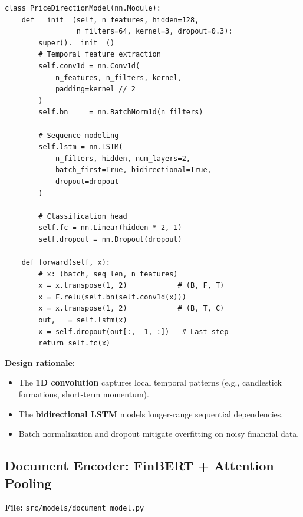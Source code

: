 \documentclass[12pt, a4paper]{article}
\begin{document}
\begin{lstlisting}[caption={Price direction model}]
class PriceDirectionModel(nn.Module):
    def __init__(self, n_features, hidden=128,
                 n_filters=64, kernel=3, dropout=0.3):
        super().__init__()
        # Temporal feature extraction
        self.conv1d = nn.Conv1d(
            n_features, n_filters, kernel,
            padding=kernel // 2
        )
        self.bn     = nn.BatchNorm1d(n_filters)
        
        # Sequence modeling
        self.lstm = nn.LSTM(
            n_filters, hidden, num_layers=2,
            batch_first=True, bidirectional=True,
            dropout=dropout
        )
        
        # Classification head
        self.fc = nn.Linear(hidden * 2, 1)
        self.dropout = nn.Dropout(dropout)
    
    def forward(self, x):
        # x: (batch, seq_len, n_features)
        x = x.transpose(1, 2)            # (B, F, T)
        x = F.relu(self.bn(self.conv1d(x)))
        x = x.transpose(1, 2)            # (B, T, C)
        out, _ = self.lstm(x)
        x = self.dropout(out[:, -1, :])   # Last step
        return self.fc(x)
\end{lstlisting}

\textbf{Design rationale:}
\begin{itemize}[nosep]
    \item The \textbf{1D convolution} captures local temporal patterns (e.g., candlestick formations, short-term momentum).
    \item The \textbf{bidirectional LSTM} models longer-range sequential dependencies.
    \item Batch normalization and dropout mitigate overfitting on noisy financial data.
\end{itemize}


\subsection{Document Encoder: FinBERT + Attention Pooling}
\label{sec:doc-model}

\noindent\textbf{File:} \texttt{src/models/document\_model.py}
\end{document}
